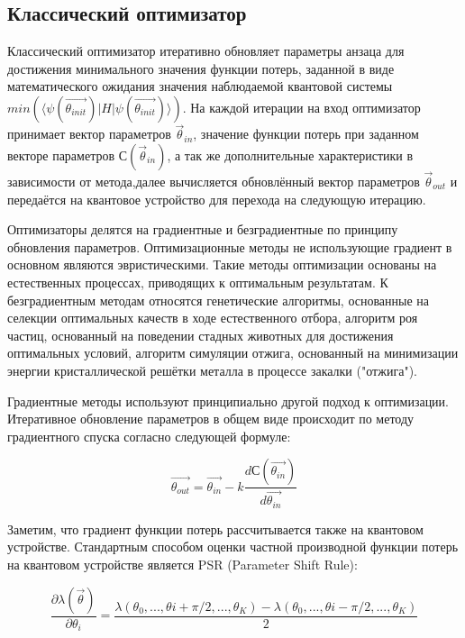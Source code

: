\documentclass[12pt]{extarticle}
\begin{document}
\subsection{Классический оптимизатор}

\qquad Классический оптимизатор итеративно обновляет параметры анзаца для достижения минимального значения функции потерь, заданной в виде математического ожидания значения наблюдаемой квантовой системы $min ( \langle \psi(\vec{\theta_{init}}) |H|\psi(\vec{\theta_{init}})\rangle )$. На каждой итерации на вход оптимизатор принимает вектор параметров $\vec \theta_{in} $, значение функции потерь при заданном векторе  параметров $С(\vec \theta_{in}) $, а так же дополнительные характеристики в зависимости от метода,далее вычисляется обновлённый вектор параметров $\vec \theta_{out} $ и передаётся на квантовое устройство для перехода на следующую итерацию.

\qquad Оптимизаторы делятся на градиентные и безградиентные по принципу обновления параметров. Оптимизационные методы не использующие градиент в основном являются эвристическими. Такие методы оптимизации основаны на естественных процессах, приводящих к оптимальным результатам. К безградиентным методам относятся генетические алгоритмы, основанные на селекции оптимальных качеств в ходе естественного отбора, алгоритм роя частиц, основанный на поведении стадных животных для достижения оптимальных условий, алгоритм симуляции отжига, основанный на минимизации энергии кристаллической решётки металла в процессе закалки ("отжига").

\qquad Градиентные методы используют принципиально другой подход к оптимизации. Итеративное обновление параметров в общем виде происходит по методу градиентного спуска согласно следующей формуле:

\begin{equation}
\vec{\theta_{out}} = \vec{\theta_{in}} - k \frac{dС(\vec{\theta_{in}})}{d\vec{\theta_{in}}}
\end{equation}

\qquad Заметим, что градиент функции потерь рассчитывается также на квантовом устройстве. Стандартным способом оценки частной производной функции потерь на квантовом устройстве является PSR (Parameter Shift Rule):

\begin{equation}
 \frac{\partial  \lambda (\vec \theta)}{\partial \theta_{i}} = \frac{ \lambda (\theta_{0},..., \theta{i} + \pi/2, ..., \theta_{K}) - \lambda (\theta_{0},..., \theta{i} - \pi/2, ..., \theta_{K})}{2}
\end{equation}
\end{document}
